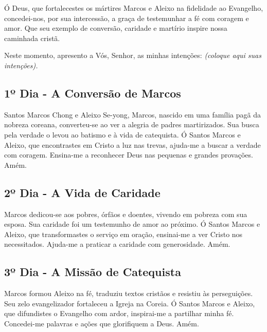\documentclass[a4paper,14pt]{extarticle} \usepackage[utf8]{inputenc}
\begin{document}
Ó Deus, que fortalecestes os mártires Marcos e Aleixo na fidelidade ao Evangelho, concedei-nos, por sua intercessão, a graça de testemunhar a fé com coragem e amor. Que seu exemplo de conversão, caridade e martírio inspire nossa caminhada cristã.

Neste momento, apresento a Vós, Senhor, as minhas intenções:
\textit{(coloque aqui suas intenções).}


\subsection{1º Dia - A Conversão de Marcos}


\underline{}

Santos Marcos Chong e Aleixo Se-yong, Marcos, nascido em uma família pagã da nobreza coreana, converteu-se ao ver a alegria de padres martirizados. Sua busca pela verdade o levou ao batismo e à vida de catequista.
Ó Santos Marcos e Aleixo, que encontrastes em Cristo a luz nas trevas, ajuda-me a buscar a verdade com coragem. Ensina-me a reconhecer Deus nas pequenas e grandes provações. Amém.

\underline{}

\subsection{2º Dia - A Vida de Caridade}

\underline{}

Marcos dedicou-se aos pobres, órfãos e doentes, vivendo em pobreza com sua esposa. Sua caridade foi um testemunho de amor ao próximo.
Ó Santos Marcos e Aleixo, que transformastes o serviço em oração, ensinai-me a ver Cristo nos necessitados. Ajuda-me a praticar a caridade com generosidade. Amém.

\underline{}

\subsection{3º Dia - A Missão de Catequista}

\underline{}

Marcos formou Aleixo na fé, traduziu textos cristãos e resistiu às perseguições. Seu zelo evangelizador fortaleceu a Igreja na Coreia.
Ó Santos Marcos e Aleixo, que difundistes o Evangelho com ardor, inspirai-me a partilhar minha fé. Concedei-me palavras e ações que glorifiquem a Deus. Amém.
\end{document}
